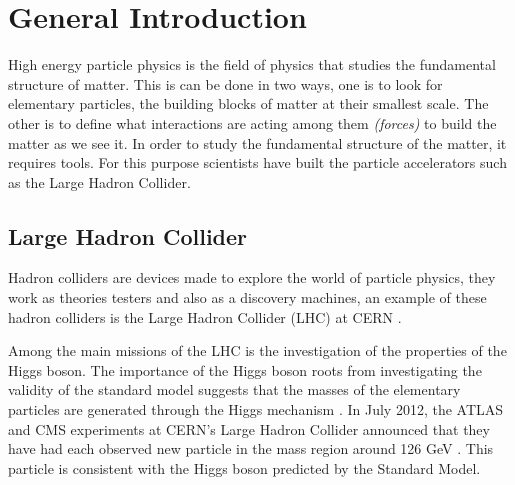 \chapter{General Introduction}




High energy particle physics is the field of physics that studies the fundamental structure of matter. This is can be done in two ways, one is to look for elementary particles, the building blocks of matter at their smallest scale. The other is to define what interactions are acting among them
\emph{(forces)} to build the matter as we see it. In order to study the fundamental structure of the matter, it requires tools.
For this purpose scientists have built the particle accelerators such as the Large Hadron Collider.



\section{Large Hadron Collider}



Hadron colliders are devices made to explore the world of particle physics, they work as theories testers
and also as a discovery machines,
an example of these hadron colliders is the Large Hadron Collider (LHC) at CERN \citep{1748-0221-3-08-S08001}.

Among the main missions of the LHC is the investigation of the properties of the Higgs boson. The importance of the Higgs boson roots
from investigating the validity of the standard model suggests
that the masses of the elementary particles are generated through the Higgs mechanism \citep{particle}.
In July 2012, the ATLAS and CMS experiments at CERN's Large Hadron Collider announced that they have had each observed new particle in the mass region around 126 GeV \citep{Aad:2012tfa}. This particle is consistent with the Higgs boson predicted by the Standard Model.  

